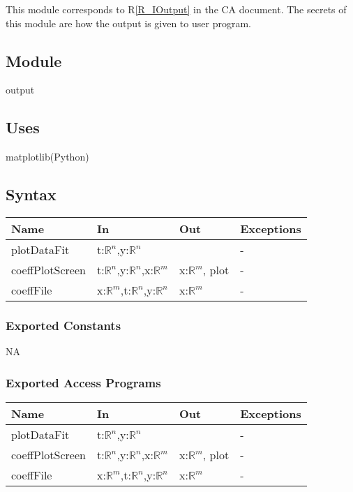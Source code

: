 \documentclass[12pt, titlepage]{article}
\begin{document}
This module corresponds to R\ref{R_IOutput} in the CA document. The secrets of 
this module are how the output is given to user program.

\subsection{Module}

output

\subsection{Uses}

matplotlib(Python)

\subsection{Syntax}

\begin{tabular}{p{3cm} p{3cm} p{4cm} >{\raggedright\arraybackslash}p{5cm}}
	\toprule
	\textbf{Name} & \textbf{In} & \textbf{Out} & \textbf{Exceptions} \\
	\midrule
	
	plotDataFit & t:$\mathbb{R}^n$,y:$\mathbb{R}^n$ &  & -  \\
	
	coeffPlotScreen & t:$\mathbb{R}^n$,y:$\mathbb{R}^n$,x:$\mathbb{R}^m$ & 
	x:$\mathbb{R}^m$, plot &  -\\
	
	coeffFile& x:$\mathbb{R}^m$,t:$\mathbb{R}^n$,y:$\mathbb{R}^n$ & 
	x:$\mathbb{R}^m$
	& - \\
	
	\midrule
	
	
	\bottomrule
\end{tabular}


\subsubsection{Exported Constants}
NA

\subsubsection{Exported Access Programs}
\begin{tabular}{p{3cm} p{3cm} p{4cm} >{\raggedright\arraybackslash}p{5cm}}
	\toprule
	\textbf{Name} & \textbf{In} & \textbf{Out} & \textbf{Exceptions} \\
	\midrule
	
	plotDataFit & t:$\mathbb{R}^n$,y:$\mathbb{R}^n$ &  & -  \\
	
	coeffPlotScreen & t:$\mathbb{R}^n$,y:$\mathbb{R}^n$,x:$\mathbb{R}^m$ & 
	x:$\mathbb{R}^m$, plot &  -\\
	
	coeffFile& x:$\mathbb{R}^m$,t:$\mathbb{R}^n$,y:$\mathbb{R}^n$ & 
	x:$\mathbb{R}^m$
	& - \\
	
	\midrule
	
	
	\bottomrule
\end{tabular}
\end{document}

